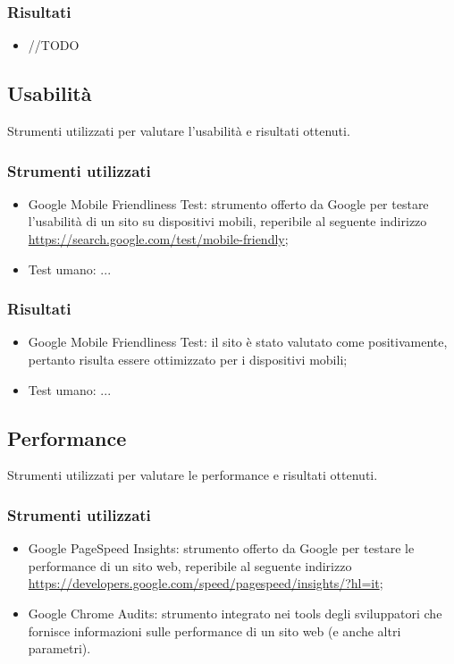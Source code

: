 \documentclass[12pt]{article}
\begin{document}
	\subsubsection{Risultati}
		\begin{itemize}
			\item //TODO
		\end{itemize}
	
	\subsection{Usabilità}
	Strumenti utilizzati per valutare l'usabilità e risultati ottenuti.
	\subsubsection{Strumenti utilizzati}
		\begin{itemize}
			\item Google Mobile Friendliness Test: strumento offerto da Google per testare l'usabilità di un sito su dispositivi mobili, reperibile al seguente indirizzo \url{https://search.google.com/test/mobile-friendly};
			\item Test umano: ...
		\end{itemize}
	\subsubsection{Risultati}
		\begin{itemize}
			\item Google Mobile Friendliness Test: il sito è stato valutato come positivamente, pertanto risulta essere ottimizzato per i dispositivi mobili;
			\item Test umano: ...
		\end{itemize}
	\subsection{Performance}
	Strumenti utilizzati per valutare le performance e risultati ottenuti.
	\subsubsection{Strumenti utilizzati}
		\begin{itemize}
			\item Google PageSpeed Insights: strumento offerto da Google per testare le performance di un sito web, reperibile al seguente indirizzo \url{https://developers.google.com/speed/pagespeed/insights/?hl=it};
			\item Google Chrome Audits: strumento integrato nei tools degli sviluppatori che fornisce informazioni sulle performance di un sito web (e anche altri parametri).
		\end{itemize}
\end{document}
